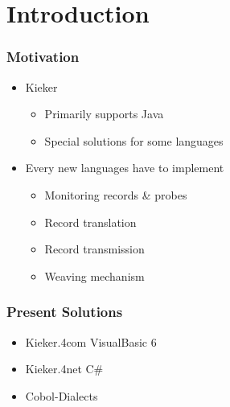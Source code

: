 
\section{Introduction}

\begin{frame}[fragile]
\frametitle{Motivation}
\begin{itemize}
\item Kieker
\begin{itemize}
\item Primarily supports Java
\item Special solutions for some languages
\end{itemize}
\item Every new languages have to implement
\begin{itemize}
\item Monitoring records \& probes
\item Record translation
\item Record transmission
\item Weaving mechanism
\end{itemize}
\end{itemize}
\end{frame}

\begin{frame}[fragile]
\frametitle{Present Solutions}
\begin{itemize}
\item Kieker.4com VisualBasic 6
\item Kieker.4net C\#
\item Cobol-Dialects
\end{itemize}
\end{frame}


